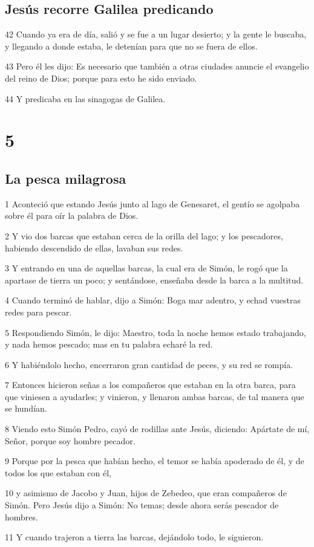 \section*{Jesús recorre Galilea predicando}

\par 42 Cuando ya era de día, salió y se fue a un lugar desierto; y la gente le buscaba, y llegando a donde estaba, le detenían para que no se fuera de ellos.
\par 43 Pero él les dijo: Es necesario que también a otras ciudades anuncie el evangelio del reino de Dios; porque para esto he sido enviado.
\par 44 Y predicaba en las sinagogas de Galilea.

\chapter{5}

\section*{La pesca milagrosa}

\par 1 Aconteció que estando Jesús junto al lago de Genesaret, el gentío se agolpaba sobre él para oír la palabra de Dios.
\par 2 Y vio dos barcas que estaban cerca de la orilla del lago; y los pescadores, habiendo descendido de ellas, lavaban sus redes.
\par 3 Y entrando en una de aquellas barcas, la cual era de Simón, le rogó que la apartase de tierra un poco; y sentándose, enseñaba desde la barca a la multitud.
\par 4 Cuando terminó de hablar, dijo a Simón: Boga mar adentro, y echad vuestras redes para pescar.
\par 5 Respondiendo Simón, le dijo: Maestro, toda la noche hemos estado trabajando, y nada hemos pescado; mas en tu palabra echaré la red.
\par 6 Y habiéndolo hecho, encerraron gran cantidad de peces, y su red se rompía.
\par 7 Entonces hicieron señas a los compañeros que estaban en la otra barca, para que viniesen a ayudarles; y vinieron, y llenaron ambas barcas, de tal manera que se hundían.
\par 8 Viendo esto Simón Pedro, cayó de rodillas ante Jesús, diciendo: Apártate de mí, Señor, porque soy hombre pecador.
\par 9 Porque por la pesca que habían hecho, el temor se había apoderado de él, y de todos los que estaban con él,
\par 10 y asimismo de Jacobo y Juan, hijos de Zebedeo, que eran compañeros de Simón. Pero Jesús dijo a Simón: No temas; desde ahora serás pescador de hombres.
\par 11 Y cuando trajeron a tierra las barcas, dejándolo todo, le siguieron.

